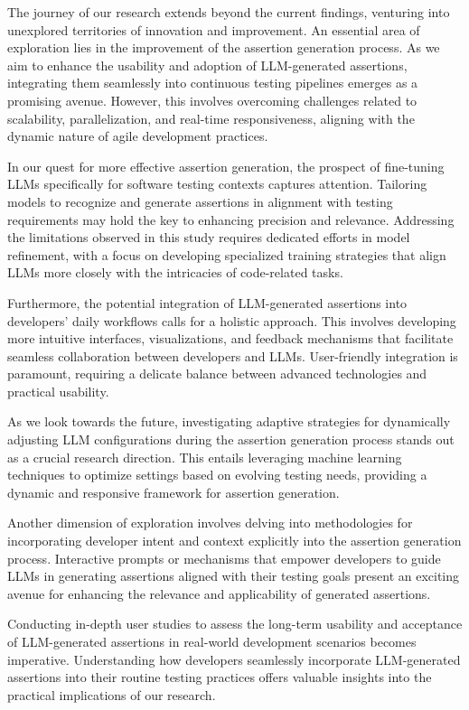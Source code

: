 The journey of our research extends beyond the current findings, venturing into unexplored territories of innovation and improvement. An essential area of exploration lies in the improvement of the assertion generation process. As we aim to enhance the usability and adoption of LLM-generated assertions, integrating them seamlessly into continuous testing pipelines emerges as a promising avenue. However, this involves overcoming challenges related to scalability, parallelization, and real-time responsiveness, aligning with the dynamic nature of agile development practices.

In our quest for more effective assertion generation, the prospect of fine-tuning LLMs specifically for software testing contexts captures attention. Tailoring models to recognize and generate assertions in alignment with testing requirements may hold the key to enhancing precision and relevance. Addressing the limitations observed in this study requires dedicated efforts in model refinement, with a focus on developing specialized training strategies that align LLMs more closely with the intricacies of code-related tasks.

Furthermore, the potential integration of LLM-generated assertions into developers' daily workflows calls for a holistic approach. This involves developing more intuitive interfaces, visualizations, and feedback mechanisms that facilitate seamless collaboration between developers and LLMs. User-friendly integration is paramount, requiring a delicate balance between advanced technologies and practical usability.

As we look towards the future, investigating adaptive strategies for dynamically adjusting LLM configurations during the assertion generation process stands out as a crucial research direction. This entails leveraging machine learning techniques to optimize settings based on evolving testing needs, providing a dynamic and responsive framework for assertion generation.

Another dimension of exploration involves delving into methodologies for incorporating developer intent and context explicitly into the assertion generation process. Interactive prompts or mechanisms that empower developers to guide LLMs in generating assertions aligned with their testing goals present an exciting avenue for enhancing the relevance and applicability of generated assertions.

Conducting in-depth user studies to assess the long-term usability and acceptance of LLM-generated assertions in real-world development scenarios becomes imperative. Understanding how developers seamlessly incorporate LLM-generated assertions into their routine testing practices offers valuable insights into the practical implications of our research.

